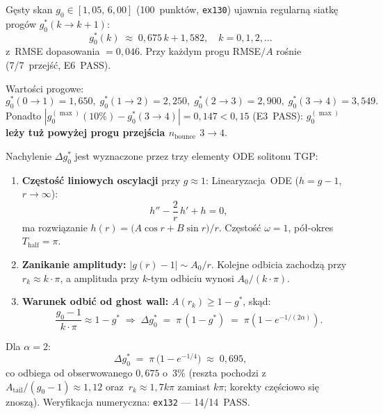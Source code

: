 \begin{proposition}%
\label{prop:T4-top5}
Gęsty skan $g_0 \in [1{,}05,\,6{,}00]$ (100~punkt\'ow, \texttt{ex130})
ujawnia regularn\k{a} siatk\k{e} prog\'ow $g_0^*(k\to k{+}1)$:
\begin{equation}\label{eq:T4-bounce-thresholds}
  g_0^*(k) \;\approx\; 0{,}675\,k + 1{,}582,
  \quad k = 0,1,2,\ldots
\end{equation}
z~RMSE dopasowania $= 0{,}046$.
Przy ka\.zdym progu RMSE$/A$ ro\'snie (7/7~przej\'s\'c, E6~PASS).

Warto\'sci progowe:
\[
  g_0^*(0{\to}1) = 1{,}650,\;
  g_0^*(1{\to}2) = 2{,}250,\;
  g_0^*(2{\to}3) = 2{,}900,\;
  g_0^*(3{\to}4) = 3{,}549.
\]
Ponadto $|g_0^{(\max)}(10\%) - g_0^*(3{\to}4)| = 0{,}147 < 0{,}15$
(E3~PASS): \textbf{$g_0^{(\max)}$ le\.zy tu\.z powy\.zej progu
przej\'scia $n_{\mathrm{bounce}}$ $3{\to}4$}.
\end{proposition}

\begin{proposition}%
\label{prop:T4-top5-analytic}
Nachylenie $\Delta g_0^*$ jest wyznaczone przez trzy elementy ODE solitonu TGP:
\begin{enumerate}
  \item \textbf{Cz\k{e}sto\'s\'c liniowych oscylacji} przy $g \approx 1$:
    Linearyzacja~ODE ($h = g-1$, $r\to\infty$):
    \begin{equation}\label{eq:T4-linearized}
      h'' - \frac{2}{r}\,h' + h = 0,
    \end{equation}
    ma rozwi\k{a}zanie $h(r) = \bigl(A\cos r + B\sin r\bigr)/r$.
    Cz\k{e}sto\'s\'c $\omega=1$, pó\l{}-okres $T_{\mathrm{half}}=\pi$.

  \item \textbf{Zanikanie amplitudy:} $|g(r)-1| \sim A_0/r$.
    Kolejne odbicia zachodz\k{a} przy $r_k \approx k\cdot\pi$,
    a amplituda przy $k$-tym odbiciu wynosi $A_0/(k\cdot\pi)$.

  \item \textbf{Warunek odbi\'c od ghost wall:}
    $A(r_k) \geq 1-g^*$, sk\k{a}d:
    \[
      \frac{g_0 - 1}{k\cdot\pi} \approx 1 - g^*
      \;\Longrightarrow\;
      \Delta g_0^* \;=\; \pi\,(1-g^*)
      \;=\; \pi\!\left(1 - e^{-1/(2\alpha)}\right).
    \]
\end{enumerate}
Dla $\alpha=2$:
\begin{equation}\label{eq:T4-deltag0-analytic}
  \boxed{
    \Delta g_0^*
    \;=\; \pi\,\bigl(1 - e^{-1/4}\bigr)
    \;\approx\; 0{,}695,
  }
\end{equation}
co odbiega od obserwowanego $0{,}675$ o~$3\%$
(reszta pochodzi z~$A_{\mathrm{tail}}/(g_0-1)\approx1{,}12$
oraz~$r_k \approx 1{,}7k\pi$ zamiast $k\pi$;
korekty cz\k{e}\'sciowo si\k{e} znosz\k{a}).
Weryfikacja numeryczna: \texttt{ex132} --- 14/14~PASS.
\end{proposition}

